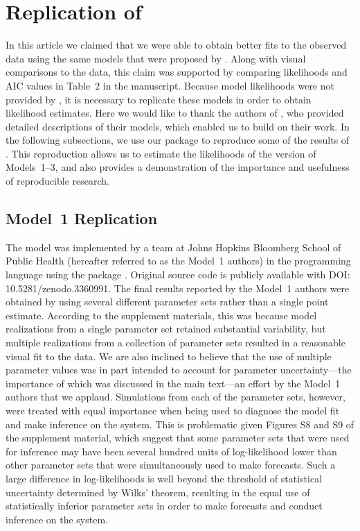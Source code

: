
\section{Replication of \cite{lee20}}

In this article we claimed that we were able to obtain better fits to the observed data using the same models that were proposed by \cite{lee20}.
Along with visual comparisons to the data, this claim was supported by comparing likelihoods and AIC values in Table~2 in the manuscript.
Because model likelihoods were not provided by \cite{lee20}, it is necessary to replicate these models in order to obtain likelihood estimates.
Here we would like to thank the authors of \cite{lee20}, who provided detailed descriptions of their models, which enabled us to build on their work.
In the following subsections, we use our  package  to reproduce some of the results of \cite{lee20}.
This reproduction allows us to estimate the likelihoods of the \cite{lee20} version of Models~1--3, and also provides a demonstration of the importance and usefulness of reproducible research.

\subsection{Model~1 Replication}

The model was implemented by a team at Johns Hopkins Bloomberg School of Public Health (hereafter referred to as the Model~1 authors) in the  programming language using the  package \citep{king16}.
Original source code is publicly available with DOI: 10.5281/zenodo.3360991.
The final results reported by the Model~1 authors were obtained by using several different parameter sets rather than a single point estimate.
According to the supplement materials, this was because model realizations from a single parameter set retained substantial variability, but multiple realizations from a collection of parameter sets resulted in a reasonable visual fit to the data.
We are also inclined to believe that the use of multiple parameter values was in part intended to account for parameter uncertainty---the importance of which was discussed in the main text---an effort by the Model~1 authors that we applaud.
Simulations from each of the parameter sets, however, were treated with equal importance when being used to diagnose the model fit and make inference on the system.
This is problematic given Figures S8 and S9 of the supplement material, which suggest that some parameter sets that were used for inference may have been several hundred units of log-likelihood lower than other parameter sets that were simultaneously used to make forecasts.
Such a large difference in log-likelihoods is well beyond the threshold of statistical uncertainty determined by Wilks' theorem, resulting in the equal use of statistically inferior parameter sets in order to make forecasts and conduct inference on the system.

